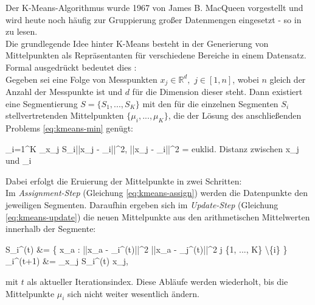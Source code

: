 			Der K-Means-Algorithmus wurde 1967 von James B. MacQueen \cite{macqueen-kmeans} vorgestellt und wird heute noch häufig zur Gruppierung großer Datenmengen eingesetzt - so in \cite{kmeans-info} zu lesen.\\
			Die grundlegende Idee hinter K-Means besteht in der Generierung von Mittelpunkten als Repräsentanten für verschiedene Bereiche in einem Datensatz. Formal ausgedrückt bedeutet dies \cite{mozdren-meth2}: \\
			Gegeben sei eine Folge von Messpunkten $x_{j} \in \mathbb{R}^{d},$ $j \in [1,n]$, wobei $n$ gleich der Anzahl der Messpunkte ist und $d$ für die Dimension dieser steht. Dann existiert eine Segmentierung $S = \{S_{1}, ..., S_{K}\}$ mit den für die einzelnen Segmenten $S_{i}$ stellvertretenden Mittelpunkten $\{\mu_{i}, ..., \mu_{K}\}$, die der Lösung des anschließenden Problems \ref{eq:kmeans-min} genügt:
			\begin{flalign}
				\centering
				 \sum_{i=1}^{K} \sum_{x_{j} \in S_{i}}\left|\left|x_{j} - \mu_{i}\right|\right|^{2}, \quad \left|\left|x_{j} - \mu_{i}\right|\right|^{2} = \textrm{euklid. Distanz zwischen } x_{j} \textrm{ und } \mu_{i}
				\label{eq:kmeans-min}
			\end{flalign}
			Dabei erfolgt die Eruierung der Mittelpunkte in zwei Schritten:\\
			Im \textit{Assignment-Step} (Gleichung \ref{eq:kmeans-assign}) werden die Datenpunkte den jeweiligen Segmenten. Daraufhin ergeben sich im \textit{Update-Step} (Gleichung \ref{eq:kmeans-update}) die neuen Mittelpunkte aus den arithmetischen Mittelwerten innerhalb der Segmente:
			\begin{flalign}
				S_{i}^{(t)} &= \left\{ x_{a} : \left|\left|x_{a} - \mu_{i}^{(t)}\right|\right|^{2} \leq \left|\left|x_{a} - \mu_{j^{(t)}}\right|\right|^{2} \forall j \in \{1, ..., K\} \textbackslash \{i\}  \right\} \label{eq:kmeans-assign}\\
				\mu_{i}^{(t+1)} &=  \sum_{x_{j} \in S_{i}^{(t)}} x_{j}, \label{eq:kmeans-update}
			\end{flalign}
			mit $t$ als aktueller Iterationsindex. Diese Abläufe werden wiederholt, bis die Mittelpunkte $\mu_{i}$ sich nicht weiter wesentlich ändern.\\